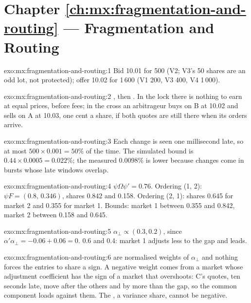 \section*{Chapter \ref{ch:mx:fragmentation-and-routing} --- Fragmentation and Routing}

\begin{solution}{exo:mx:fragmentation-and-routing:1}
Bid 10.01 for 500 (V2; V3's 50 shares are an odd lot, not protected); offer 10.02 for 1\,600 (V1 200, V3 400, V4 1\,000).
\end{solution}

\begin{solution}{exo:mx:fragmentation-and-routing:2}
, then . In the lock there is nothing to earn at equal prices, before fees; in the cross an arbitrageur buys on B at 10.02 and sells on A at
10.03, one cent a share, if both quotes are still there when its orders arrive.
\end{solution}

\begin{solution}{exo:mx:fragmentation-and-routing:3}
Each change is seen one millisecond late, so at most $500\times0.001=50\%$ of the time. The simulated bound is $0.44\times0.0005=0.022\%$; the measured
0.0098\% is lower because changes come in bursts whose late windows overlap.
\end{solution}

\begin{solution}{exo:mx:fragmentation-and-routing:4}
$\psi\Omega\psi'=0.76$. Ordering (1, 2): $\psi F=(0.8,\,0.346)$, shares 0.842 and 0.158. Ordering (2, 1): shares 0.645 for market 2 and 0.355 for market 1.
Bounds: market 1 between 0.355 and 0.842, market 2 between 0.158 and 0.645.
\end{solution}

\begin{solution}{exo:mx:fragmentation-and-routing:5}
$\alpha_\perp\propto(0.3,0.2)$, since $\alpha'\alpha_\perp=-0.06+0.06=0$.  0.6 and 0.4: market 1 adjusts less to the gap and leads.
\end{solution}

\begin{solution}{exo:mx:fragmentation-and-routing:6}
 are normalised weights of $\alpha_\perp$ and nothing forces the entries to share a sign. A negative weight comes from a market whose
adjustment coefficient has the sign of a market that overshoots: C's quotes, ten seconds late, move after the others and by more than the gap, so the
common component loads against them. The , a variance share, cannot be negative.
\end{solution}

